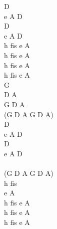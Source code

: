 \documentclass[a5paper, 10pt]{book}
\begin{document}
\begin{minipage}[t]{0.3\textwidth}
  D\\
  e A D\\
  D\\
  e A D\\

  h fis e A\\
  h fis e A\\
  h fis e A\\
  h fis e A\\

  G\\
  D A\\
  G D A\\
  (G D A G D A)\\
  D\\
  e A D\\
  D\\
  e A D\\

  ~\\
  (G D A G D A)\\
  h fis\\
  e A\\
  h fis e A\\
  h fis e A\\
  h fis e A\\
\end{minipage}

\newpage
\end{document}

